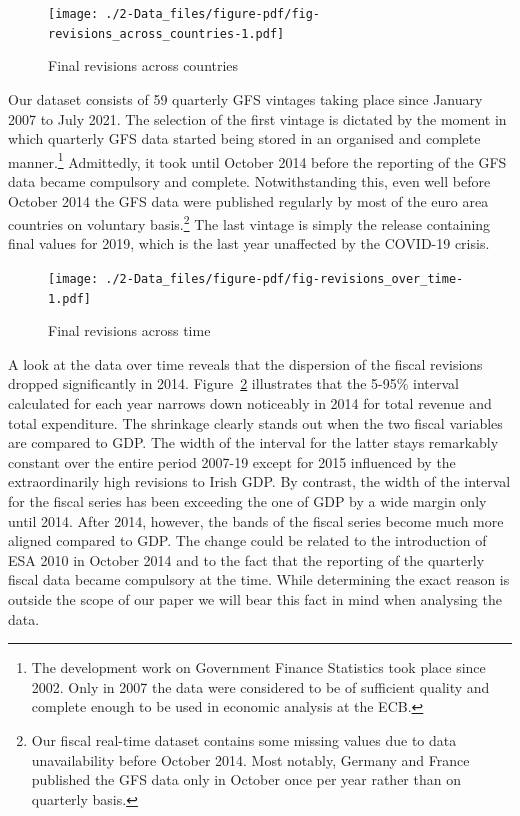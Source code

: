 \documentclass[
  letterpaper,
  authoryear,
  preprint,
  3p]{elsarticle}
\begin{document}
\begin{figure}[H]

{\centering \texttt{[image: ./2-Data\_files/figure-pdf/fig-revisions\_across\_countries-1.pdf]}

}

\caption{\label{fig-revisions_across_countries}Final revisions across
countries}

\end{figure}

Our dataset consists of 59 quarterly GFS vintages taking place since
January 2007 to July 2021. The selection of the first vintage is
dictated by the moment in which quarterly GFS data started being stored
in an organised and complete manner.\footnote{The development work on
  Government Finance Statistics took place since 2002. Only in 2007 the
  data were considered to be of sufficient quality and complete enough
  to be used in economic analysis at the ECB.} Admittedly, it took until
October 2014 before the reporting of the GFS data became compulsory and
complete. Notwithstanding this, even well before October 2014 the GFS
data were published regularly by most of the euro area countries on
voluntary basis.\footnote{Our fiscal real-time dataset contains some
  missing values due to data unavailability before October 2014. Most
  notably, Germany and France published the GFS data only in October
  once per year rather than on quarterly basis.} The last vintage is
simply the release containing final values for 2019, which is the last
year unaffected by the COVID-19 crisis.

\begin{figure}[H]

{\centering \texttt{[image: ./2-Data\_files/figure-pdf/fig-revisions\_over\_time-1.pdf]}

}

\caption{\label{fig-revisions_over_time}Final revisions across time}

\end{figure}

A look at the data over time reveals that the dispersion of the fiscal
revisions dropped significantly in 2014.
Figure~\ref{fig-revisions_over_time} illustrates that the 5-95\%
interval calculated for each year narrows down noticeably in 2014 for
total revenue and total expenditure. The shrinkage clearly stands out
when the two fiscal variables are compared to GDP. The width of the
interval for the latter stays remarkably constant over the entire period
2007-19 except for 2015 influenced by the extraordinarily high revisions
to Irish GDP. By contrast, the width of the interval for the fiscal
series has been exceeding the one of GDP by a wide margin only until
2014. After 2014, however, the bands of the fiscal series become much
more aligned compared to GDP. The change could be related to the
introduction of ESA 2010 in October 2014 and to the fact that the
reporting of the quarterly fiscal data became compulsory at the time.
While determining the exact reason is outside the scope of our paper we
will bear this fact in mind when analysing the data.
\end{document}
